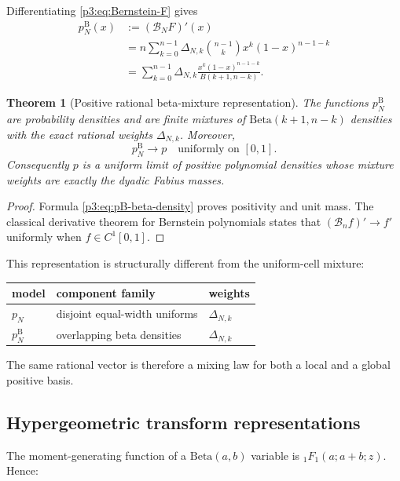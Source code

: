 \documentclass[11pt]{article}
\newtheorem{theorem}{Theorem}[section]
\theoremstyle{definition}
\theoremstyle{remark}
\begin{document}
Differentiating \eqref{p3:eq:Bernstein-F} gives
\begin{align}
 p_N^{\mathrm{B}}(x)
 &:=(\mathcal B_NF)'(x)\\
 &=n\sum_{k=0}^{n-1}\Delta_{N,k}
   \binom{n-1}{k}x^k(1-x)^{n-1-k}\\
 &=\sum_{k=0}^{n-1}\Delta_{N,k}
   \frac{x^k(1-x)^{n-1-k}}{B(k+1,n-k)}.
 \label{p3:eq:pB-beta-density}
\end{align}

\begin{theorem}[Positive rational beta-mixture representation]
\label{p3:thm:beta-mixture}
The functions $p_N^{\mathrm B}$ are probability densities and are finite
mixtures of $\mathrm{Beta}(k+1,n-k)$ densities with the exact rational weights
$\Delta_{N,k}$.  Moreover,
\begin{equation}\label{p3:eq:pB-uniform}
 p_N^{\mathrm B}\longrightarrow p
 \quad\text{uniformly on }[0,1].
\end{equation}
Consequently $p$ is a uniform limit of positive polynomial densities whose
mixture weights are exactly the dyadic Fabius masses.
\end{theorem}

\begin{proof}
Formula \eqref{p3:eq:pB-beta-density} proves positivity and unit mass.  The
classical derivative theorem for Bernstein polynomials states that
$(\mathcal B_n f)'\to f'$ uniformly when $f\in C^1[0,1]$.
\end{proof}

This representation is structurally different from the uniform-cell mixture:
\begin{center}
\begin{tabular}{@{}lll@{}}
\toprule
model & component family & weights\\
\midrule
$p_N$ & disjoint equal-width uniforms & $\Delta_{N,k}$\\
$p_N^{\mathrm B}$ & overlapping beta densities & $\Delta_{N,k}$\\
\bottomrule
\end{tabular}
\end{center}
The same rational vector is therefore a mixing law for both a local and a
global positive basis.

\subsection{Hypergeometric transform representations}

The moment-generating function of a $\mathrm{Beta}(a,b)$ variable is
${}_1F_1(a;a+b;z)$.  Hence:
\end{document}
